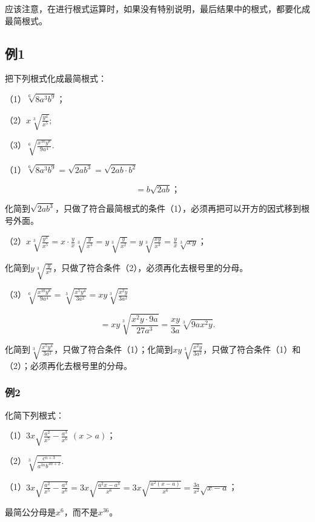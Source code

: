 应该注意，在进行根式运算时，如果没有特别说明，最后结果中的根式，都要化成最简根式。

\subsection{例1}

把下列根式化成最简根式：

（1）\(\sqrt[6]{8a^3b^9}\)；

（2）\(x\sqrt[3]{\frac{y^4}{x^5}};\)

（3）\(\sqrt[6]{\frac{x^{10}y^8}{9a^4}}.\)

（1）\(\sqrt[6]{8a^3b^9} = \sqrt{2ab^3} = \sqrt{2ab\cdot b^2}\)

\[
= b \sqrt {2 a b}\text{；}
\]

化简到\(\sqrt{2ab^3}\)，只做了符合最简根式的条件（1），必须再把可以开方的因式移到根号外面。

（2）\(x\sqrt[3]{\frac{y^4}{x^5}} = x \cdot \frac{y}{x} \sqrt[3]{\frac{y}{x^3}} = y \sqrt[3]{\frac{y}{x^2}} = y \sqrt[3]{\frac{xy}{x^3}} = \frac{y}{x} \sqrt[3]{xy}\)；

化简到\(y\sqrt[3]{\frac{y}{x^2}}\)，只做了符合条件（2），必须再化去根号里的分母。

（3）\(\sqrt[6]{\frac{x^{10}y^8}{9a^4}} = \sqrt[3]{\frac{x^5y^4}{3a^2}} = xy\sqrt[3]{\frac{x^2y}{3a^2}}\)

\[
= x y \sqrt[3]{\frac{x ^ {2} y \cdot 9 a}{27 a ^ {3}}} = \frac{x y}{3 a} \sqrt[3]{9 a x ^ {2} y}.
\]

化简到\(\sqrt[3]{\frac{x^5y^4}{3a^2}}\)，只做了符合条件（1）；化简到\(xy\sqrt[3]{\frac{x^2y}{3a^2}}\)，只做了符合条件（1）和（2）；必须再化去根号里的分母。

\subsubsection{例2}

化简下列根式：

（1）\(3x\sqrt{\frac{a^2}{x^5} - \frac{a^3}{x^6}}\) \((x > a)\)；

（2）\(\sqrt[3]{\frac{c^{n+3}}{a^{3n}b^{3n+2}}}.\)

（1）\(3x\sqrt{\frac{a^2}{x^5} - \frac{a^3}{x^6}} = 3x\sqrt{\frac{a^2x - a^3}{x^6}} = 3x\sqrt{\frac{a^2(x - a)}{x^6}} = \frac{3a}{x^2}\sqrt{x - a}\)；

 最简公分母是\(x^6\)，而不是\(x^{36}\)。

